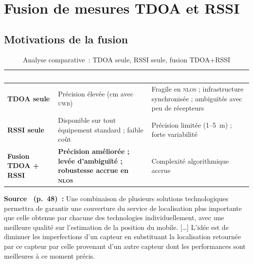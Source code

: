 \documentclass[12pt, a4paper]{article}
\newcommand{\UWB}{\textsc{uwb}}
\newcommand{\NLOS}{\textsc{nlos}}
\begin{document}
\section{Fusion de mesures TDOA et RSSI}

\subsection{Motivations de la fusion}

\begin{table}[h!]
  \centering
  \caption{Analyse comparative~: TDOA seule, RSSI seule, fusion TDOA+RSSI}
  \label{tab:comparaison}
  \renewcommand{\arraystretch}{1.3}
  \begin{tabularx}{\textwidth}{
    >{\bfseries\centering\arraybackslash}p{2.8cm}
    >{\centering\arraybackslash}X
    >{\centering\arraybackslash}X
  }
    \toprule
    \rowcolor{iemnblue}
    \textcolor{white}{Approche} &
    \textcolor{white}{Avantages} &
    \textcolor{white}{Inconvénients} \\
    \midrule
    TDOA seule
      & Précision élevée (cm avec \UWB{})
      & Fragile en \NLOS{} ; infrastructure synchronisée ; ambiguïtés avec peu
        de récepteurs \\
    \rowcolor{iemnlightblue!40}
    RSSI seule
      & Disponible sur tout équipement standard ; faible coût
      & Précision limitée (1–5~m) ; forte variabilité \\
    \textbf{Fusion TDOA + RSSI}
      & \textbf{Précision améliorée ; levée d'ambiguïté ; robustesse accrue en \NLOS{}}
      & Complexité algorithmique accrue \\
    \bottomrule
  \end{tabularx}
\end{table}

\begin{citebox}
\textbf{Source~\cite{Evennou2007} (p.~48)~:} \og{}Une combinaison de plusieurs
solutions technologiques permettra de garantir une couverture du service de
localisation plus importante que celle obtenue par chacune des technologies
individuellement, avec une meilleure qualité sur l'estimation de la position du
mobile. [\ldots] L'idée est de diminuer les imperfections d'un capteur en substituant
la localisation retournée par ce capteur par celle provenant d'un autre capteur dont
les performances sont meilleures à ce moment précis.\fg{}
\end{citebox}
\end{document}
